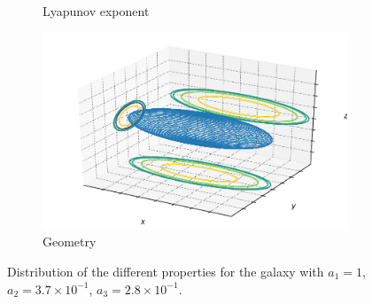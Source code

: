 \begin{figure}[h]
\begin{subfigure}[t]{0.4\textwidth}
        \caption{Lyapunov exponent}
    \end{subfigure}
    \begin{subfigure}[t]{0.4\textwidth}
        \includegraphics[width=\textwidth]{"../Files/Week 13/images/16_ellipsoid"}
        \caption{Geometry}
    \end{subfigure}
    \caption{Distribution of the different properties for the galaxy with $a_1 = 1$, $a_2 = 3.7\times10^{-1}$, $a_3 = 2.8\times10^{-1}$.}
\end{figure}


